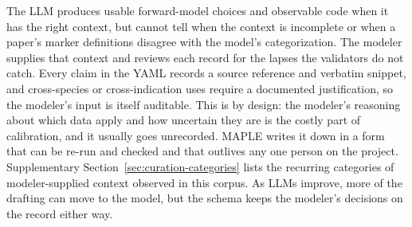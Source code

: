 The LLM produces usable forward-model choices and observable code when it has the right context, but cannot tell when the context is incomplete or when a paper's marker definitions disagree with the model's categorization. The modeler supplies that context and reviews each record for the lapses the validators do not catch. Every claim in the YAML records a source reference and verbatim snippet, and cross-species or cross-indication uses require a documented justification, so the modeler's input is itself auditable. This is by design: the modeler's reasoning about which data apply and how uncertain they are is the costly part of calibration, and it usually goes unrecorded. MAPLE writes it down in a form that can be re-run and checked and that outlives any one person on the project. Supplementary Section~\ref{sec:curation-categories} lists the recurring categories of modeler-supplied context observed in this corpus. As LLMs improve, more of the drafting can move to the model, but the schema keeps the modeler's decisions on the record either way.

